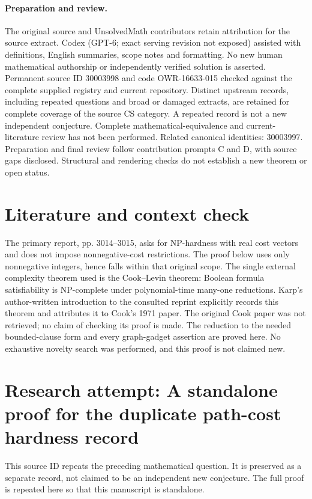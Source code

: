 \documentclass[11pt]{article}
\begin{document}
\paragraph{Preparation and review.}
The original source and UnsolvedMath contributors retain attribution for the source extract. Codex (GPT-6; exact serving revision not exposed) assisted with definitions, English summaries, scope notes and formatting. No new human mathematical authorship or independently verified solution is asserted. Permanent source ID 30003998 and code OWR-16633-015 checked against the complete supplied registry and current repository. Distinct upstream records, including repeated questions and broad or damaged extracts, are retained for complete coverage of the source CS category. A repeated record is not a new independent conjecture. Complete mathematical-equivalence and current-literature review has not been performed. Related canonical identities: 30003997. Preparation and final review follow contribution prompts C and D, with source gaps disclosed. Structural and rendering checks do not establish a new theorem or open status.
\label{end:30003998}

\section{Literature and context check}
The primary report, pp. 3014--3015, asks for NP-hardness with real cost vectors and does not impose nonnegative-cost restrictions. The proof below uses only nonnegative integers, hence falls within that original scope. The single external complexity theorem used is the Cook--Levin theorem: Boolean formula satisfiability is NP-complete under polynomial-time many-one reductions. Karp's author-written introduction to the consulted reprint explicitly records this theorem and attributes it to Cook's 1971 paper. The original Cook paper was not retrieved; no claim of checking its proof is made. The reduction to the needed bounded-clause form and every graph-gadget assertion are proved here. No exhaustive novelty search was performed, and this proof is not claimed new.
\section{Research attempt: A standalone proof for the duplicate path-cost hardness record}
This source ID repeats the preceding mathematical question. It is preserved as a separate record, not claimed to be an independent new conjecture. The full proof is repeated here so that this manuscript is standalone.
\end{document}
